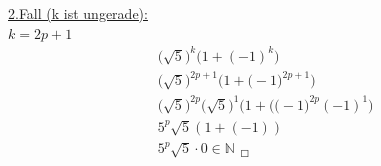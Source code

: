 \newpage
\noindent
\underline{2.Fall (k ist ungerade):}\\
$ k=2p+1 $\\
\begin{align*}
	&\big(\sqrt{5}\big)^k\big(1+(-1)^k\big)\\
	&\big(\sqrt{5}\big)^{2p+1}\Big(1+\big(-1\big)^{2p+1}\Big)\\
	&\big(\sqrt{5}\big)^{2p}\big(\sqrt{5}\big)^1 \big(1+\big(\big(-1\big)^{2p}(-1)^1\big)\\
	&5^p\sqrt{5}(1+(-1))\\
	&5^p\sqrt{5}\cdot 0 \in \mathbb{N}_{\;\;\Square}
\end{align*}
